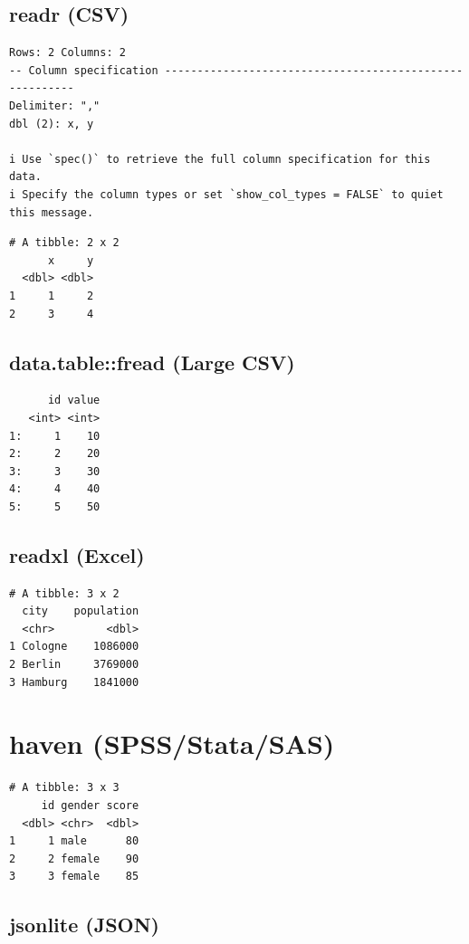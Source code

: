 \documentclass[
  doc,
  longtable,
  a4paper,
  nolmodern,
  notxfonts,
  notimes,
  colorlinks=true,linkcolor=blue,citecolor=blue,urlcolor=blue]{apa7}
\begin{document}
\subsection{readr (CSV)}\label{readr-csv}

\begin{verbatim}
Rows: 2 Columns: 2
-- Column specification --------------------------------------------------------
Delimiter: ","
dbl (2): x, y

i Use `spec()` to retrieve the full column specification for this data.
i Specify the column types or set `show_col_types = FALSE` to quiet this message.
\end{verbatim}

\begin{verbatim}
# A tibble: 2 x 2
      x     y
  <dbl> <dbl>
1     1     2
2     3     4
\end{verbatim}

\subsection{data.table::fread (Large
CSV)}\label{data.tablefread-large-csv}

\begin{verbatim}
      id value
   <int> <int>
1:     1    10
2:     2    20
3:     3    30
4:     4    40
5:     5    50
\end{verbatim}

\subsection{readxl (Excel)}\label{readxl-excel}

\begin{verbatim}
# A tibble: 3 x 2
  city    population
  <chr>        <dbl>
1 Cologne    1086000
2 Berlin     3769000
3 Hamburg    1841000
\end{verbatim}

\section{haven (SPSS/Stata/SAS)}\label{haven-spssstatasas}

\begin{verbatim}
# A tibble: 3 x 3
     id gender score
  <dbl> <chr>  <dbl>
1     1 male      80
2     2 female    90
3     3 female    85
\end{verbatim}

\subsection{jsonlite (JSON)}\label{jsonlite-json}
\end{document}
